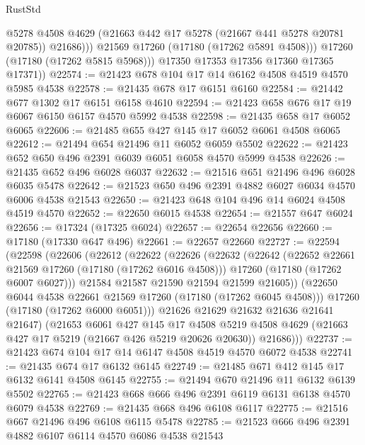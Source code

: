 \begin{lexlean}{RustStd}
\begin{coremodule}
{\begin{coremodule}
{{{{{{{{{{{{{{{{{{{{{{{{{{{{{{{{{{{{{{{{{{{{{{{{{{{{{{{                  @5278
                  @4508
                  @4629
                  (@21663 @442 @17 @5278 (@21667 @441 @5278 @20781 @20785))
                  @21686)))
            @21569
            @17260
            (@17180 (@17262 @5891 @4508)))
          @17260
          (@17180 (@17262 @5815 @5968)))
        @17350
        @17353
        @17356
        @17360
        @17365
        @17371))
@22574 := @21423 @678 @104 @17 @14 @6162 @4508 @4519 @4570 @5985 @4538
@22578 := @21435 @678 @17 @6151 @6160
@22584 := @21442 @677 @1302 @17 @6151 @6158 @4610
@22594 := @21423 @658 @676 @17 @19 @6067 @6150 @6157 @4570 @5992 @4538
@22598 := @21435 @658 @17 @6052 @6065
@22606 := @21485 @655 @427 @145 @17 @6052 @6061 @4508 @6065
@22612 := @21494 @654 @21496 @11 @6052 @6059 @5502
@22622 := @21423 @652 @650 @496 @2391 @6039 @6051 @6058 @4570 @5999 @4538
@22626 := @21435 @652 @496 @6028 @6037
@22632 := @21516 @651 @21496 @496 @6028 @6035 @5478
@22642 := @21523 @650 @496 @2391 @4882 @6027 @6034 @4570 @6006 @4538 @21543
@22650 := @21423 @648 @104 @496 @14 @6024 @4508 @4519 @4570
@22652 := @22650 @6015 @4538
@22654 := @21557 @647 @6024
@22656 := @17324 (@17325 @6024)
@22657 := @22654 @22656
@22660 := @17180 (@17330 @647 @496)
@22661 := @22657 @22660
@22727 := @22594
    (@22598
      (@22606
        (@22612
          (@22622
            (@22626
              (@22632
                (@22642
                  (@22652 @22661 @21569 @17260 (@17180 (@17262 @6016 @4508)))
                  @17260
                  (@17180 (@17262 @6007 @6027)))
                @21584
                @21587
                @21590
                @21594
                @21599
                @21605))
            (@22650 @6044 @4538 @22661 @21569 @17260 (@17180 (@17262 @6045 @4508)))
            @17260
            (@17180 (@17262 @6000 @6051)))
          @21626
          @21629
          @21632
          @21636
          @21641
          @21647)
        (@21653
          @6061
          @427
          @145
          @17
          @4508
          @5219
          @4508
          @4629
          (@21663 @427 @17 @5219 (@21667 @426 @5219 @20626 @20630))
          @21686)))
@22737 := @21423 @674 @104 @17 @14 @6147 @4508 @4519 @4570 @6072 @4538
@22741 := @21435 @674 @17 @6132 @6145
@22749 := @21485 @671 @412 @145 @17 @6132 @6141 @4508 @6145
@22755 := @21494 @670 @21496 @11 @6132 @6139 @5502
@22765 := @21423 @668 @666 @496 @2391 @6119 @6131 @6138 @4570 @6079 @4538
@22769 := @21435 @668 @496 @6108 @6117
@22775 := @21516 @667 @21496 @496 @6108 @6115 @5478
@22785 := @21523 @666 @496 @2391 @4882 @6107 @6114 @4570 @6086 @4538 @21543
}}}}}}}}}}}}}}}}}}}}}}}}}}}}}}}}}}}}}}}}}}}}}}}}}}}}}}}
\end{coremodule}}
\end{coremodule}
\end{lexlean}
